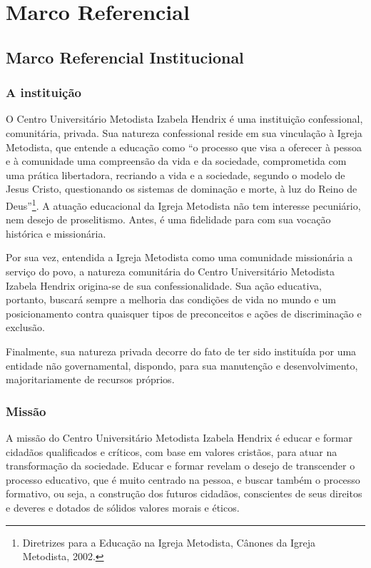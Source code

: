 \documentclass[a4paper, 12pt, openright, oneside, german, french, english, brazil]{abntex2}
\begin{document}
\chapter{Marco Referencial}

\section{Marco Referencial Institucional}

\subsection{A instituição}

O Centro Universitário Metodista Izabela Hendrix é uma instituição confessional, comunitária, privada. Sua natureza confessional reside em sua vinculação à Igreja Metodista, que entende a educação como ``o processo que visa a oferecer à pessoa e à comunidade uma compreensão da vida e da sociedade, comprometida com uma prática libertadora, recriando a vida e a sociedade, segundo o modelo de Jesus Cristo, questionando os sistemas de dominação e morte, à luz do Reino de Deus''\footnote{Diretrizes para a Educação na Igreja Metodista, Cânones da Igreja Metodista, 2002.}. A atuação educacional da Igreja Metodista não tem interesse pecuniário, nem desejo de proselitismo. Antes, é uma fidelidade para com sua vocação histórica e missionária.

Por sua vez, entendida a Igreja Metodista como uma comunidade missionária a serviço do povo, a natureza comunitária do Centro Universitário Metodista Izabela Hendrix origina-se de sua confessionalidade. Sua ação educativa, portanto, buscará sempre a melhoria das condições de vida no mundo e um posicionamento contra quaisquer tipos de preconceitos e ações de discriminação e exclusão.

Finalmente, sua natureza privada decorre do fato de ter sido instituída por uma entidade não governamental, dispondo, para sua manutenção e desenvolvimento, majoritariamente de recursos próprios.

\subsection{Missão}

A missão do Centro Universitário Metodista Izabela Hendrix é educar e formar cidadãos qualificados e críticos, com base em valores cristãos, para atuar na transformação da sociedade. Educar e formar revelam o desejo de transcender o processo educativo, que é muito centrado na pessoa, e buscar também o processo formativo, ou seja, a construção dos futuros cidadãos, conscientes de seus direitos e deveres e dotados de sólidos valores morais e éticos.
\end{document}

